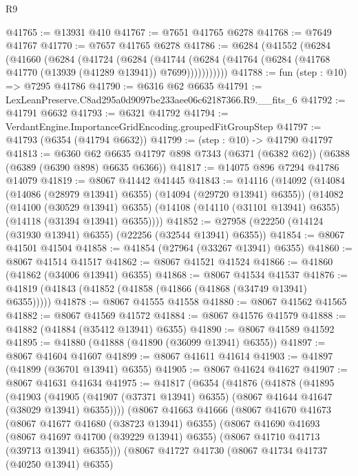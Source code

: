 \begin{lexlean}{R9}
\begin{coremodule}
@41765 := @13931 @410
@41767 := @7651 @41765 @6278
@41768 := @7649 @41767
@41770 := @7657 @41765 @6278
@41786 := @6284
    (@41552
      (@6284
        (@41660
          (@6284
            (@41724
              (@6284
                (@41744
                  (@6284 (@41764 (@6284 (@41768 @41770 (@13939 (@41289 @13941)) @7699)))))))))))
@41788 := fun (step : @10) => @7295 @41786
@41790 := @6316 @62 @6635
@41791 := LexLeanPreserve.C8ad295a0d9097be233aee06c62187366.R9.__fits_6
@41792 := @41791 @6632
@41793 := @6321 @41792
@41794 := VerdantEngine.ImportanceGridEncoding.groupedFitGroupStep
@41797 := @41793 (@6354 (@41794 @6632))
@41799 := (step : @10) -> @41790 @41797
@41813 := @6360
    @62
    @6635
    @41797
    @898
    @7343
    (@6371 (@6382 @62))
    (@6388 (@6389 (@6390 @898) @6635 @6366))
@41817 := @14075 @896 @7294 @41786 @14079
@41819 := @8067 @41442 @41445
@41843 := @14116
    (@14092
      (@14084 (@14086 (@28979 @13941) @6355) (@14094 (@29720 @13941) @6355))
      (@14082
        (@14100 (@30529 @13941) @6355)
        (@14108 (@14110 (@31101 @13941) @6355) (@14118 (@31394 @13941) @6355))))
@41852 := @27958 (@22250 (@14124 (@31930 @13941) @6355) (@22256 (@32544 @13941) @6355))
@41854 := @8067 @41501 @41504
@41858 := @41854 (@27964 (@33267 @13941) @6355)
@41860 := @8067 @41514 @41517
@41862 := @8067 @41521 @41524
@41866 := @41860 (@41862 (@34006 @13941) @6355)
@41868 := @8067 @41534 @41537
@41876 := @41819 (@41843 (@41852 (@41858 (@41866 (@41868 (@34749 @13941) @6355)))))
@41878 := @8067 @41555 @41558
@41880 := @8067 @41562 @41565
@41882 := @8067 @41569 @41572
@41884 := @8067 @41576 @41579
@41888 := @41882 (@41884 (@35412 @13941) @6355)
@41890 := @8067 @41589 @41592
@41895 := @41880 (@41888 (@41890 (@36099 @13941) @6355))
@41897 := @8067 @41604 @41607
@41899 := @8067 @41611 @41614
@41903 := @41897 (@41899 (@36701 @13941) @6355)
@41905 := @8067 @41624 @41627
@41907 := @8067 @41631 @41634
@41975 := @41817
    (@6354
      (@41876
        (@41878
          (@41895
            (@41903
              (@41905 (@41907 (@37371 @13941) @6355) (@8067 @41644 @41647 (@38029 @13941) @6355))))
          (@8067
            @41663
            @41666
            (@8067
              @41670
              @41673
              (@8067 @41677 @41680 (@38723 @13941) @6355)
              (@8067
                @41690
                @41693
                (@8067 @41697 @41700 (@39229 @13941) @6355)
                (@8067 @41710 @41713 (@39713 @13941) @6355)))
            (@8067
              @41727
              @41730
              (@8067 @41734 @41737 (@40250 @13941) @6355)

\end{coremodule}
\end{lexlean}
